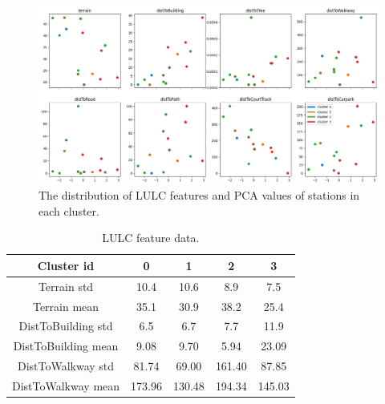 \documentclass[a4paper,fleqn]{cas-sc}
\begin{document}
\begin{figure}
    \centering
    \includegraphics[scale=0.4]{figs/new_figs/clusterLULCplot.png}
    \caption{The distribution of LULC features and PCA values of stations in each cluster.}
    \label{fig:DTWclusteringLULCdata}
\end{figure}

\begin{table}[width=.45\linewidth,pos=h]
    \caption{LULC feature data.}
    \label{tab:LULC_label}
    \centering
    \begin{tabular}{c | c c c c}
    \toprule
         Cluster id & 0 & 1 & 2 & 3 \\
    \midrule
         Terrain std& 10.4 & 10.6 & 8.9 & 7.5 \\
         Terrain mean& 35.1 & 30.9 & 38.2 & 25.4 \\
         DistToBuilding std& 6.5 & 6.7 & 7.7 & 11.9 \\
         DistToBuilding mean& 9.08 & 9.70 & 5.94 & 23.09 \\
         DistToWalkway std& 81.74 & 69.00 & 161.40 & 87.85 \\
         DistToWalkway mean& 173.96 & 130.48 & 194.34 & 145.03 \\
         \bottomrule
    \end{tabular}
\end{table}

\end{document}

